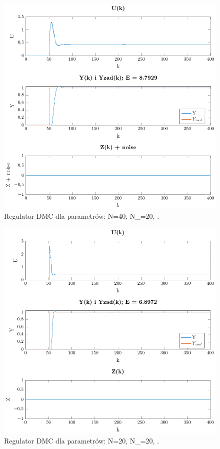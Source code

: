 \documentclass[a4paper,titlepage,11pt,twosides,floatssmall]{mwrep}
\begin{document}
 
\begin{figure}[H]
	\centering
	\includegraphics[scale=0.85]{../../Lab2/PDF_rysunki/Z4_DMCParametryN_40_Nu_20_lam_2.pdf}
	\caption{Regulator DMC dla parametrów: N=40, N_{}=20, .}
	\label{dobor_param5}
\end{figure}



\begin{figure}[H]
	\centering
	\includegraphics[scale=0.85]{../../Lab2/PDF_rysunki/Z4_DMCBezZaklocen.pdf}
	\caption{Regulator DMC dla parametrów: N=20, N_{}=20, .}
	\label{dobor_param4}
\end{figure}
\end{document}
